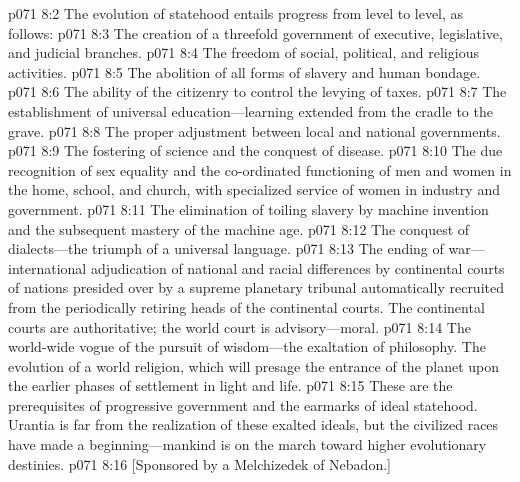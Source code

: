 \vs p071 8:2 The evolution of statehood entails progress from level to level, as follows:
\pc \vs p071 8:3 \bibnobreakspace The creation of a threefold government of executive, legislative, and judicial branches.
\pc \vs p071 8:4 \bibnobreakspace The freedom of social, political, and religious activities.
\pc \vs p071 8:5 \bibnobreakspace The abolition of all forms of slavery and human bondage.
\pc \vs p071 8:6 \bibnobreakspace The ability of the citizenry to control the levying of taxes.
\pc \vs p071 8:7 \bibnobreakspace The es\-tab\-lish\-ment of uni\-ver\-sal edu\-ca\-tion---learning extended from the cradle to the grave.
\pc \vs p071 8:8 \bibnobreakspace The proper adjustment between local and national governments.
\pc \vs p071 8:9 \bibnobreakspace The fostering of science and the conquest of disease.
\pc \vs p071 8:10 \bibnobreakspace The due recognition of sex equality and the co\hyp{}ordinated functioning of men and women in the home, school, and church, with specialized service of women in industry and government.
\pc \vs p071 8:11 \bibnobreakspace The elimination of toiling slavery by machine invention and the subsequent mastery of the machine age.
\pc \vs p071 8:12 \bibnobreakspace The conquest of dialects---the triumph of a universal language.
\pc \vs p071 8:13 \bibnobreakspace The ending of war---international adjudication of national and racial differences by continental courts of nations presided over by a supreme planetary tribunal automatically recruited from the periodically retiring heads of the continental courts. The continental courts are authoritative; the world court is advisory---moral.
\pc \vs p071 8:14 \bibnobreakspace The world\hyp{}wide vogue of the pursuit of wisdom---the exaltation of philosophy. The evolution of a world religion, which will presage the entrance of the planet upon the earlier phases of settlement in light and life.
\pc \vs p071 8:15 These are the prerequisites of progressive government and the earmarks of ideal statehood. Urantia is far from the realization of these exalted ideals, but the civilized races have made a beginning---mankind is on the march toward higher evolutionary destinies.
\vsetoff
\vs p071 8:16 [Sponsored by a Melchizedek of Nebadon.]
